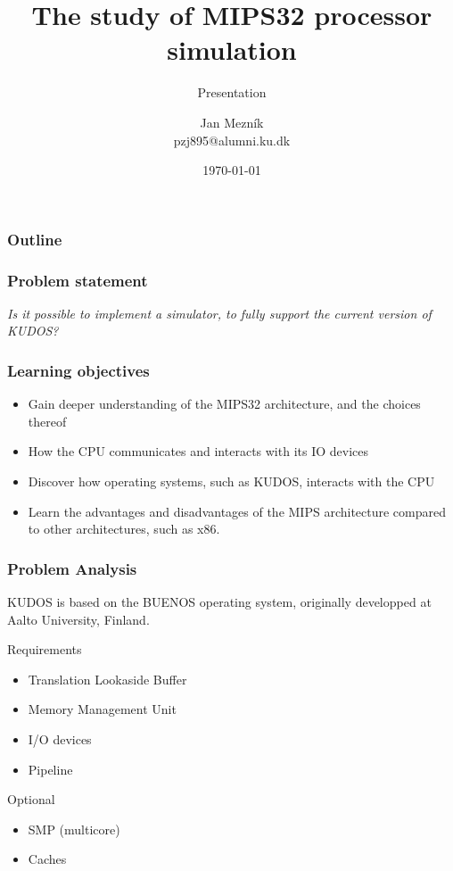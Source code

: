 \documentclass{beamer}
\title{The study of MIPS32 processor simulation}
\subtitle{Presentation}
\author{Jan Mezník\\pzj895@alumni.ku.dk}
\institute{Copenhagen University}
\date{\today}
\begin{document}
\frame[plain]{\titlepage}

\begin{frame}
\frametitle{Outline}
\tableofcontents
\end{frame}


\begin{frame}
	\frametitle{Problem statement}
	\textit{Is it possible to implement a simulator, to fully support the
		current version of KUDOS?}\\
\end{frame}

\begin{frame}
	\frametitle{Learning objectives}

	\begin{itemize}
		\item Gain deeper understanding of the MIPS32 architecture, and
		the choices thereof

		\item How the CPU communicates and interacts with its IO devices

		\item Discover how operating systems, such as KUDOS, interacts
		with the CPU

		\item Learn the advantages and disadvantages of the MIPS architecture
		compared to other architectures, such as x86.
	\end{itemize}
\end{frame}

\begin{frame}
	\frametitle{Problem Analysis}
	KUDOS is based on the BUENOS operating system, originally developped at
	Aalto University, Finland.

\begin{block}{Requirements}
	\begin{itemize}
		\item Translation Lookaside Buffer
		\item Memory Management Unit
		\item I/O devices
		\item Pipeline
	\end{itemize}
\end{block}
\begin{block}{Optional}
	\begin{itemize}
		\item SMP (multicore)
		\item Caches
	\end{itemize}
\end{block}
\end{frame}
\end{document}
